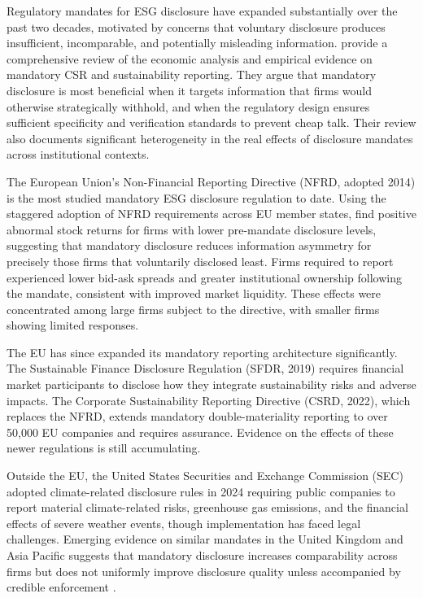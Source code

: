 Regulatory mandates for ESG disclosure have expanded substantially over the past
two decades, motivated by concerns that voluntary disclosure produces
insufficient, incomparable, and potentially misleading information.
\textcite{Christensen2021_mandatory} provide a comprehensive review of the
economic analysis and empirical evidence on mandatory CSR and sustainability
reporting. They argue that mandatory disclosure is most beneficial when it
targets information that firms would otherwise strategically withhold, and when
the regulatory design ensures sufficient specificity and verification standards
to prevent cheap talk. Their review also documents significant heterogeneity in
the real effects of disclosure mandates across institutional contexts.

The European Union's Non-Financial Reporting Directive (NFRD, adopted 2014) is
the most studied mandatory ESG disclosure regulation to date. Using the
staggered adoption of NFRD requirements across EU member states,
\textcite{Grewal2019_disclosure} find positive abnormal stock returns for firms
with lower pre-mandate disclosure levels, suggesting that mandatory disclosure
reduces information asymmetry for precisely those firms that voluntarily
disclosed least. Firms required to report experienced lower bid-ask spreads and
greater institutional ownership following the mandate, consistent with improved
market liquidity. These effects were concentrated among large firms subject to
the directive, with smaller firms showing limited responses.

The EU has since expanded its mandatory reporting architecture significantly.
The Sustainable Finance Disclosure Regulation (SFDR, 2019) requires financial
market participants to disclose how they integrate sustainability risks and
adverse impacts. The Corporate Sustainability Reporting Directive (CSRD, 2022),
which replaces the NFRD, extends mandatory double-materiality reporting to over
50,000 EU companies and requires assurance. Evidence on the effects of these
newer regulations is still accumulating.

Outside the EU, the United States Securities and Exchange Commission (SEC)
adopted climate-related disclosure rules in 2024 requiring public companies to
report material climate-related risks, greenhouse gas emissions, and the
financial effects of severe weather events, though implementation has faced
legal challenges. Emerging evidence on similar mandates in the United
Kingdom and Asia Pacific suggests that mandatory disclosure increases
comparability across firms but does not uniformly improve disclosure quality
unless accompanied by credible enforcement \citep{Christensen2021_mandatory}.

